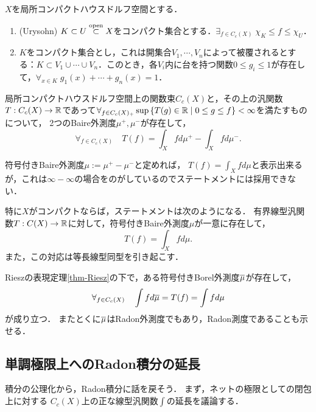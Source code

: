 \documentclass[uplatex,dvipdfmx]{jsreport}
\begin{document}
\begin{lemma}
    $X$を局所コンパクトハウスドルフ空間とする．
    \begin{enumerate}
        \item (Urysohn) $K\subset U\overset{\mathrm{open}}{\subset} X$をコンパクト集合とする．$\exists_{f\in C_c(X)}\;\chi_K\le f\le\chi_U$．
        \item $K$をコンパクト集合とし，これは開集合$V_1,\cdots,V_n$によって被覆されるとする：$K\subset V_1\cup\cdots\cup V_n$．このとき，各$V_i$内に台を持つ関数$0\le g_i\le1$が存在して，$\forall_{x\in K}\;g_1(x)+\cdots+g_n(x)=1$．
    \end{enumerate}
\end{lemma}


\begin{theorem}[Riesz]\label{thm-Riesz}
    局所コンパクトハウスドルフ空間上の関数束$C_c(X)$と，その上の汎関数$T:C_c(X)\to\mathbb{R}$であって$\forall_{f\in C_c(X)_+}\sup\left\{T(g)\in\mathbb{R}\mid0\le g\le f\right\}<\infty$を満たすものについて，
    2つのBaire外測度$\mu^+,\mu^-$が存在して，
    \[\forall_{f\in C_c(X)}\quad T(f)=\int_Xfd\mu^+-\int_Xfd\mu^-.\]
\end{theorem}
\begin{remark}
    符号付きBaire外測度$\mu:=\mu^+-\mu^-$と定めれば，
    $T(f)=\int_Xfd\mu$と表示出来るが，これは$\infty-\infty$の場合をのがしているのでステートメントには採用できない．
\end{remark}

\begin{corollary}
    特に$X$がコンパクトならば，ステートメントは次のようになる．
    有界線型汎関数$T:C(X)\to\mathbb{R}$に対して，符号付きBaire外測度$\mu$が一意に存在して，
    \[T(f)=\int_Xfd\mu.\]
    また，この対応は等長線型同型を引き起こす．
\end{corollary}

\begin{theorem}
    Rieszの表現定理\ref{thm-Riesz}の下で，ある符号付きBorel外測度$\overline{\mu}$が存在して，
    \[\forall_{f\in C_c(X)}\quad\int fd\overline{\mu}=T(f)=\int fd\mu\]
    が成り立つ．
    またとくに$\overline{\mu}$はRadon外測度でもあり，Radon測度であることも示せる．
\end{theorem}

\subsection{単調極限上へのRadon積分の延長}

\begin{tcolorbox}[colframe=ForestGreen, colback=ForestGreen!10!white,breakable,colbacktitle=ForestGreen!40!white,coltitle=black,fonttitle=\bfseries\sffamily,
title=]
    積分の公理化から，Radon積分に話を戻そう．
    まず，ネットの極限としての閉包上に対する
    $C_c(X)$上の正な線型汎関数$\int$の延長を議論する．
\end{tcolorbox}
\end{document}
